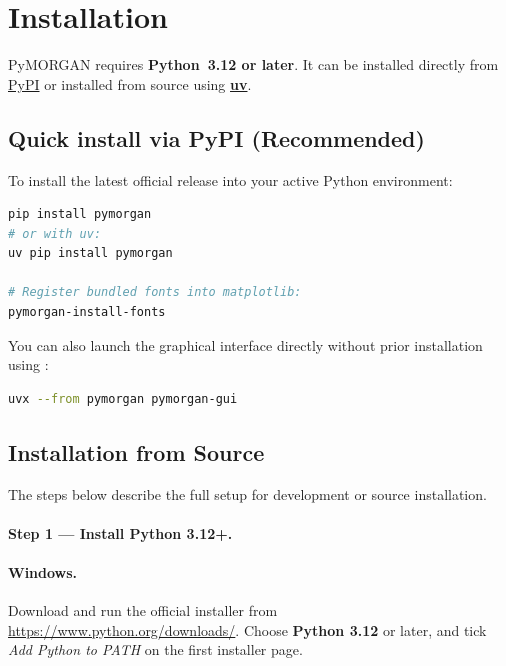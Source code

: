 \section{Installation}\label{sec:installation}

PyMORGAN requires \textbf{Python~3.12 or later}. It can be installed directly from \href{https://pypi.org/project/pymorgan/}{PyPI} or installed from source using \href{https://docs.astral.sh/uv/}{\textbf{uv}}.

\subsection{Quick install via PyPI (Recommended)}\label{sec:install-pypi}

To install the latest official release into your active Python environment:

\begin{lstlisting}[language=bash, style=py]
pip install pymorgan
# or with uv:
uv pip install pymorgan

# Register bundled fonts into matplotlib:
pymorgan-install-fonts
\end{lstlisting}

\noindent You can also launch the graphical interface directly without prior installation using :

\begin{lstlisting}[language=bash, style=py]
uvx --from pymorgan pymorgan-gui
\end{lstlisting}

\subsection{Installation from Source}\label{sec:install-source}

The steps below describe the full setup for development or source installation.

\paragraph{Step 1 — Install Python 3.12+.}

\paragraph{Windows.}
Download and run the official installer from
\url{https://www.python.org/downloads/}. Choose \textbf{Python 3.12} or
later, and tick \emph{Add Python to PATH} on the first installer page.

